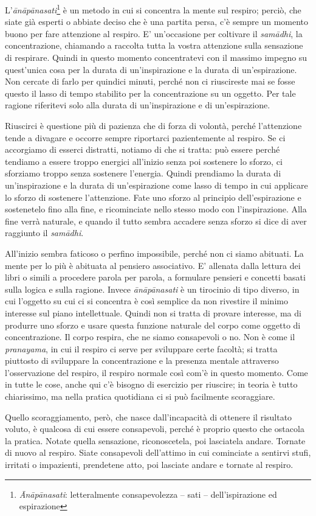 
L'\textit{ānāpānasati}\footnote{\textit{Ānāpānasati}: letteralmente consapevolezza – sati –
dell'ispirazione ed espirazione} è un metodo in cui si concentra la mente sul
respiro; perciò, che siate già esperti o abbiate deciso che è una
partita persa, c'è sempre un momento buono per fare attenzione al
respiro. E' un'occasione per coltivare il \textit{samādhi}, la concentrazione,
chiamando a raccolta tutta la vostra attenzione sulla sensazione di
respirare. Quindi in questo momento concentratevi con il massimo impegno
su quest'unica cosa per la durata di un'inspirazione e la durata di
un'espirazione. Non cercate di farlo per quindici minuti, perché non ci
riuscireste mai se fosse questo il lasso di tempo stabilito per la
concentrazione su un oggetto. Per tale ragione riferitevi solo alla
durata di un'inspirazione e di un'espirazione.

Riuscirci è questione più di pazienza che di forza di volontà, perché
l'attenzione tende a divagare e occorre sempre riportarci pazientemente
al respiro. Se ci accorgiamo di esserci distratti, notiamo di che si
tratta: può essere perché tendiamo a essere troppo energici all'inizio
senza poi sostenere lo sforzo, ci sforziamo troppo senza sostenere
l'energia. Quindi prendiamo la durata di un'inspirazione e la durata di
un'espirazione come lasso di tempo in cui applicare lo sforzo di
sostenere l'attenzione. Fate uno sforzo al principio dell'espirazione e
sostenetelo fino alla fine, e ricominciate nello stesso modo con
l'inspirazione. Alla fine verrà naturale, e quando il tutto sembra
accadere senza sforzo si dice di aver raggiunto il \textit{samādhi}.

All'inizio sembra faticoso o perfino impossibile, perché non ci siamo
abituati. La mente per lo più è abituata al pensiero associativo. E'
allenata dalla lettura dei libri o simili a procedere parola per parola,
a formulare pensieri e concetti basati sulla logica e sulla ragione.
Invece \textit{ānāpānasati} è un tirocinio di tipo diverso, in cui l'oggetto su
cui ci si concentra è così semplice da non rivestire il minimo interesse
sul piano intellettuale. Quindi non si tratta di provare interesse, ma
di produrre uno sforzo e usare questa funzione naturale del corpo come
oggetto di concentrazione. Il corpo respira, che ne siamo consapevoli o
no. Non è come il \textit{pranayama}, in cui il respiro ci serve per sviluppare
certe facoltà; si tratta piuttosto di sviluppare la concentrazione e la
presenza mentale attraverso l'osservazione del respiro, il respiro
normale così com'è in questo momento. Come in tutte le cose, anche qui
c'è bisogno di esercizio per riuscire; in teoria è tutto chiarissimo, ma
nella pratica quotidiana ci si può facilmente scoraggiare.

Quello scoraggiamento, però, che nasce dall'incapacità di ottenere il
risultato voluto, è qualcosa di cui essere consapevoli, perché è proprio
questo che ostacola la pratica. Notate quella sensazione, riconoscetela,
poi lasciatela andare. Tornate di nuovo al respiro. Siate consapevoli
dell'attimo in cui cominciate a sentirvi stufi, irritati o impazienti,
prendetene atto, poi lasciate andare e tornate al respiro.

